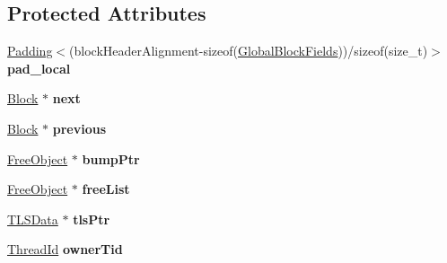 \subsection*{Protected Attributes}
\begin{DoxyCompactItemize}
\item 
\hypertarget{classrml_1_1internal_1_1LocalBlockFields_ae06da34ce5654e2e24f63aa9fcfdfe01}{}\hyperlink{structrml_1_1internal_1_1Padding}{Padding}$<$(block\+Header\+Alignment-\/sizeof(\hyperlink{classrml_1_1internal_1_1GlobalBlockFields}{Global\+Block\+Fields}))/sizeof(size\+\_\+t)$>$ {\bfseries pad\+\_\+local}\label{classrml_1_1internal_1_1LocalBlockFields_ae06da34ce5654e2e24f63aa9fcfdfe01}

\item 
\hypertarget{classrml_1_1internal_1_1LocalBlockFields_ab0858e200e0125219210fe856e98fa28}{}\hyperlink{classrml_1_1internal_1_1Block}{Block} $\ast$ {\bfseries next}\label{classrml_1_1internal_1_1LocalBlockFields_ab0858e200e0125219210fe856e98fa28}

\item 
\hypertarget{classrml_1_1internal_1_1LocalBlockFields_a3a5c6afadff504e7196e643938f26cad}{}\hyperlink{classrml_1_1internal_1_1Block}{Block} $\ast$ {\bfseries previous}\label{classrml_1_1internal_1_1LocalBlockFields_a3a5c6afadff504e7196e643938f26cad}

\item 
\hypertarget{classrml_1_1internal_1_1LocalBlockFields_a7539e25da68797f70368fa66e62e9c1c}{}\hyperlink{structrml_1_1internal_1_1FreeObject}{Free\+Object} $\ast$ {\bfseries bump\+Ptr}\label{classrml_1_1internal_1_1LocalBlockFields_a7539e25da68797f70368fa66e62e9c1c}

\item 
\hypertarget{classrml_1_1internal_1_1LocalBlockFields_ade8311f40ae3e9114518063032b7c42a}{}\hyperlink{structrml_1_1internal_1_1FreeObject}{Free\+Object} $\ast$ {\bfseries free\+List}\label{classrml_1_1internal_1_1LocalBlockFields_ade8311f40ae3e9114518063032b7c42a}

\item 
\hypertarget{classrml_1_1internal_1_1LocalBlockFields_ac591e79d62cf0ee8907a3e60991d0734}{}\hyperlink{classrml_1_1internal_1_1TLSData}{T\+L\+S\+Data} $\ast$ {\bfseries tls\+Ptr}\label{classrml_1_1internal_1_1LocalBlockFields_ac591e79d62cf0ee8907a3e60991d0734}

\item 
\hypertarget{classrml_1_1internal_1_1LocalBlockFields_a22b6910d3d56fd1183c5c4a1ed44e09f}{}\hyperlink{classrml_1_1internal_1_1ThreadId}{Thread\+Id} {\bfseries owner\+Tid}\label{classrml_1_1internal_1_1LocalBlockFields_a22b6910d3d56fd1183c5c4a1ed44e09f}


\end{DoxyCompactItemize}
